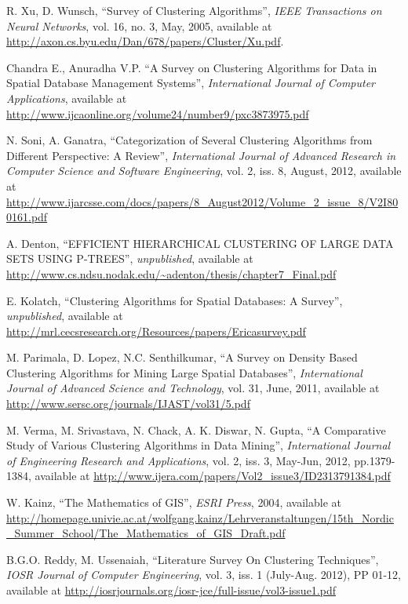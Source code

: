 \documentclass[conference, 10pt]{IEEEtran}
\begin{document}
\newpage
\begin{thebibliography}{1}

 R. Xu, D. Wunsch, ``Survey of Clustering Algorithms'', \emph{IEEE Transactions on Neural Networks}, vol. 16, no. 3, May, 2005, available at 
\url{http://axon.cs.byu.edu/Dan/678/papers/Cluster/Xu.pdf}.

 Chandra E., Anuradha V.P. ``A Survey on Clustering Algorithms for Data in Spatial Database Management Systems'', \emph{International Journal of Computer Applications}, available at
\url{http://www.ijcaonline.org/volume24/number9/pxc3873975.pdf}

 N. Soni, A. Ganatra, ``Categorization of Several Clustering Algorithms from Different Perspective: A Review'', \emph{International Journal of Advanced Research in Computer Science and Software Engineering}, vol. 2, iss. 8, August, 2012, available at
\url{http://www.ijarcsse.com/docs/papers/8_August2012/Volume_2_issue_8/V2I800161.pdf}

 A. Denton, ``EFFICIENT HIERARCHICAL CLUSTERING OF LARGE DATA SETS USING P-TREES'', \emph{unpublished}, available at
\url{http://www.cs.ndsu.nodak.edu/~adenton/thesis/chapter7_Final.pdf}

 E. Kolatch, ``Clustering Algorithms for Spatial Databases: A Survey'', \emph{unpublished}, available at
\url{http://mrl.cecsresearch.org/Resources/papers/Ericasurvey.pdf}

 M. Parimala, D. Lopez, N.C. Senthilkumar, ``A Survey on Density Based Clustering Algorithms for Mining Large Spatial Databases'', \emph{International Journal of Advanced Science and Technology}, vol. 31, June, 2011, available at
\url{http://www.sersc.org/journals/IJAST/vol31/5.pdf}

 M. Verma, M. Srivastava, N. Chack, A. K. Diswar, N. Gupta, ``A Comparative Study of Various Clustering Algorithms in Data Mining'', \emph{International Journal of Engineering Research and Applications}, vol. 2, iss. 3, May-Jun, 2012, pp.1379-1384, available at
\url{http://www.ijera.com/papers/Vol2_issue3/ID2313791384.pdf}

 W. Kainz, ``The Mathematics of GIS'', \emph{ESRI Press}, 2004, available at
\url{http://homepage.univie.ac.at/wolfgang.kainz/Lehrveranstaltungen/15th_Nordic_Summer_School/The_Mathematics_of_GIS_Draft.pdf}

 B.G.O. Reddy, M. Ussenaiah, ``Literature Survey On Clustering Techniques'', \emph{IOSR Journal of Computer Engineering}, vol. 3, iss. 1 (July-Aug. 2012), PP 01-12, available at
\url{http://iosrjournals.org/iosr-jce/full-issue/vol3-issue1.pdf}


\end{thebibliography}
\end{document}
